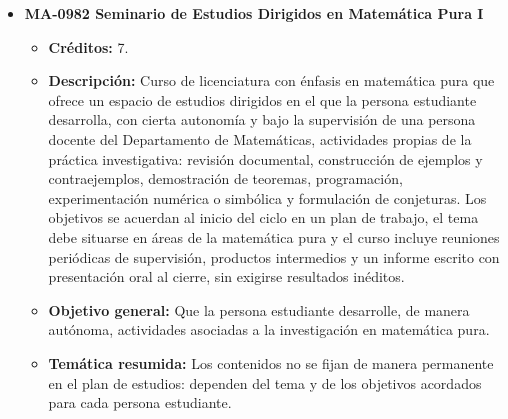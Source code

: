 \begin{itemize}[leftmargin=1.3em, itemsep=10pt, topsep=4pt, label={\color{Azul-UCR}$\blacksquare$}]
\item {\color{Azul-UCR}\textbf{MA-0982 Seminario de Estudios Dirigidos en Matemática Pura I}}\par\nopagebreak\smallskip
\begin{itemize}[leftmargin=1.1em, itemsep=3pt, topsep=2pt, parsep=2pt, label={\textendash}]
\item \textbf{Créditos:} 7.
\item \textbf{Descripción:} Curso de licenciatura con énfasis en matemática pura que ofrece un espacio de estudios dirigidos en el que la persona estudiante desarrolla, con cierta autonomía y bajo la supervisión de una persona docente del Departamento de Matemáticas, actividades propias de la práctica investigativa: revisión documental, construcción de ejemplos y contraejemplos, demostración de teoremas, programación, experimentación numérica o simbólica y formulación de conjeturas. Los objetivos se acuerdan al inicio del ciclo en un plan de trabajo, el tema debe situarse en áreas de la matemática pura y el curso incluye reuniones periódicas de supervisión, productos intermedios y un informe escrito con presentación oral al cierre, sin exigirse resultados inéditos.
\item \textbf{Objetivo general:} Que la persona estudiante desarrolle, de manera autónoma, actividades asociadas a la investigación en matemática pura.
\item \textbf{Temática resumida:} Los contenidos no se fijan de manera permanente en el plan de estudios: dependen del tema y de los objetivos acordados para cada persona estudiante.
\end{itemize}


\end{itemize}
